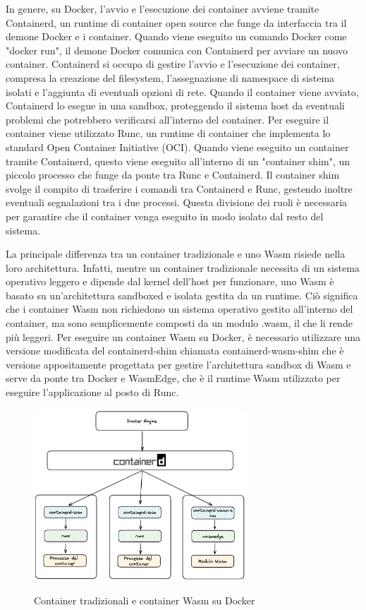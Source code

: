 In genere, su Docker, l'avvio e l'esecuzione dei container avviene tramite Containerd, un runtime di container open
source che funge da interfaccia tra il demone Docker e i container. Quando viene eseguito un comando Docker come "docker
run", il demone Docker comunica con Containerd per avviare un nuovo container. Containerd si occupa di gestire l'avvio e
l'esecuzione dei container, compresa la creazione del filesystem, l'assegnazione di namespace di sistema isolati e
l'aggiunta di eventuali opzioni di rete. Quando il container viene avviato, Containerd lo esegue in una sandbox,
proteggendo il sistema host da eventuali problemi che potrebbero verificarsi all'interno del container. Per eseguire il
container viene utilizzato Runc, un runtime di container che implementa lo standard Open Container Initiative (OCI).
Quando viene eseguito un container tramite Containerd, questo viene eseguito all'interno di un "container shim", un
piccolo processo che funge da ponte tra Runc e Containerd. Il container shim svolge il compito di trasferire i comandi
tra Containerd e Runc, gestendo inoltre eventuali segnalazioni tra i due processi. Questa divisione dei ruoli è
necessaria per garantire che il container venga eseguito in modo isolato dal resto del sistema.

La principale differenza tra un container tradizionale e uno Wasm risiede nella loro architettura. Infatti, mentre un
container tradizionale necessita di un sistema operativo leggero e dipende dal kernel dell'host per funzionare, uno Wasm
è basato su un'architettura sandboxed e isolata gestita da un runtime. Ciò significa che i container Wasm non richiedono
un sistema operativo gestito all'interno del container, ma sono semplicemente composti da un modulo .wasm, il che li
rende più leggeri. Per eseguire un container Wasm su Docker, è necessario utilizzare una versione modificata del
containerd-shim chiamata containerd-wasm-shim che è versione appositamente progettata per gestire l'architettura sandbox
di Wasm e serve da ponte tra Docker e WasmEdge, che è il runtime Wasm utilizzato per eseguire l'applicazione al posto di
Runc.
\begin{figure}[h]
    \centering
    \captionsetup{justification=centering}
    \includegraphics[width=8cm]{./chapters/2.wasi-in-depth/images/10.docker_and_wasm.png}
    \label{docker_and_wasm_wasmedge}
    \caption{Container tradizionali e container Wasm su Docker}
\end{figure}

